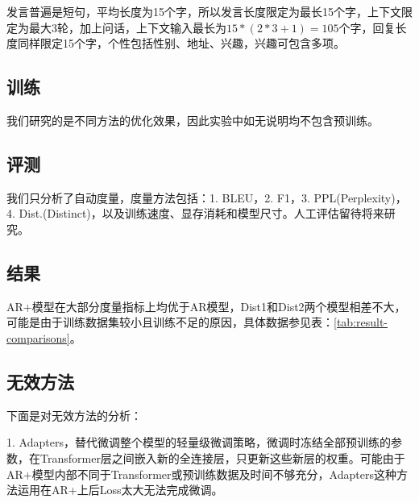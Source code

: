 \documentclass[letterpaper]{article} %
\DeclareRobustCommand{\citeext}[1]{\cite[#1]{#1}}
\begin{document}
\begin{CJK*}{UTF8}{gbsn}
发言普遍是短句，平均长度为15个字，所以发言长度限定为最长15个字，上下文限定为最大3轮，加上问话，上下文输入最长为$15*(2*3+1)=105$个字，回复长度同样限定15个字，个性包括性别、地址、兴趣，兴趣可包含多项。

\subsection[Training]{训练}
我们研究的是不同方法的优化效果，因此实验中如无说明均不包含预训练。

\subsection[Evaluation]{评测} 
我们只分析了自动度量，度量方法包括：1. BLEU\citeext{Papineni2002}，2. F1，3. PPL(Perplexity)，4. Dist.(Distinct)\citeext{Li2016}，以及训练速度、显存消耗和模型尺寸。人工评估留待将来研究。

\subsection[Result]{结果} 
AR+模型在大部分度量指标上均优于AR模型，Dist1和Dist2两个模型相差不大，可能是由于训练数据集较小且训练不足的原因，具体数据参见表：\ref{tab:result-comparisons}。

\begin{table*} [b]
\centering
\caption{实验结果，加粗的数据为改进指标}
\label{tab:result-comparisons}
\end{table*}


\subsection[Ineffective Methods]{无效方法} 
下面是对无效方法的分析：

1. Adapters\citeext{Houlsby2019}，替代微调整个模型的轻量级微调策略，微调时冻结全部预训练的参数，在Transformer层之间嵌入新的全连接层，只更新这些新层的权重。可能由于AR+模型内部不同于Transformer或预训练数据及时间不够充分，Adapters这种方法运用在AR+上后Loss太大无法完成微调。


\end{CJK*}
\end{document}
